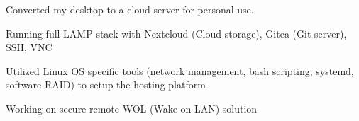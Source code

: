 Converted my desktop to a cloud server for personal use. 
\medskip
\begin{cvitemize}
  \item Running full LAMP stack with Nextcloud (Cloud storage), Gitea (Git server), SSH, VNC
  \item Utilized Linux OS specific tools (network management, bash scripting, systemd, software RAID) to setup the hosting platform
  \item Working on secure remote WOL (Wake on LAN) solution
\end{cvitemize}
